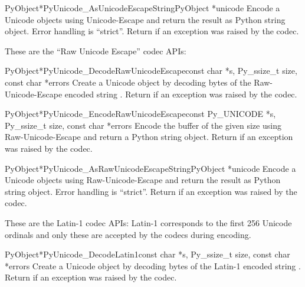 \begin{cfuncdesc}{PyObject*}{PyUnicode_AsUnicodeEscapeString}{PyObject *unicode}
  Encode a Unicode objects using Unicode-Escape and return the
  result as Python string object.  Error handling is ``strict''.
  Return \NULL{} if an exception was raised by the codec.
\end{cfuncdesc}


These are the ``Raw Unicode Escape'' codec APIs:

\begin{cfuncdesc}{PyObject*}{PyUnicode_DecodeRawUnicodeEscape}{const char *s,
                                               Py_ssize_t size,
                                               const char *errors}
  Create a Unicode object by decoding  bytes of the
  Raw-Unicode-Escape encoded string .  Return \NULL{} if an
  exception was raised by the codec.
\end{cfuncdesc}

\begin{cfuncdesc}{PyObject*}{PyUnicode_EncodeRawUnicodeEscape}{const Py_UNICODE *s,
                                               Py_ssize_t size,
                                               const char *errors}
  Encode the  buffer of the given size using
  Raw-Unicode-Escape and return a Python string object.  Return
  \NULL{} if an exception was raised by the codec.
\end{cfuncdesc}

\begin{cfuncdesc}{PyObject*}{PyUnicode_AsRawUnicodeEscapeString}{PyObject *unicode}
  Encode a Unicode objects using Raw-Unicode-Escape and return the
  result as Python string object. Error handling is ``strict''.
  Return \NULL{} if an exception was raised by the codec.
\end{cfuncdesc}


These are the Latin-1 codec APIs:
Latin-1 corresponds to the first 256 Unicode ordinals and only these
are accepted by the codecs during encoding.

\begin{cfuncdesc}{PyObject*}{PyUnicode_DecodeLatin1}{const char *s,
                                                     Py_ssize_t size,
                                                     const char *errors}
  Create a Unicode object by decoding  bytes of the Latin-1
  encoded string .  Return \NULL{} if an exception was raised
  by the codec.
\end{cfuncdesc}

